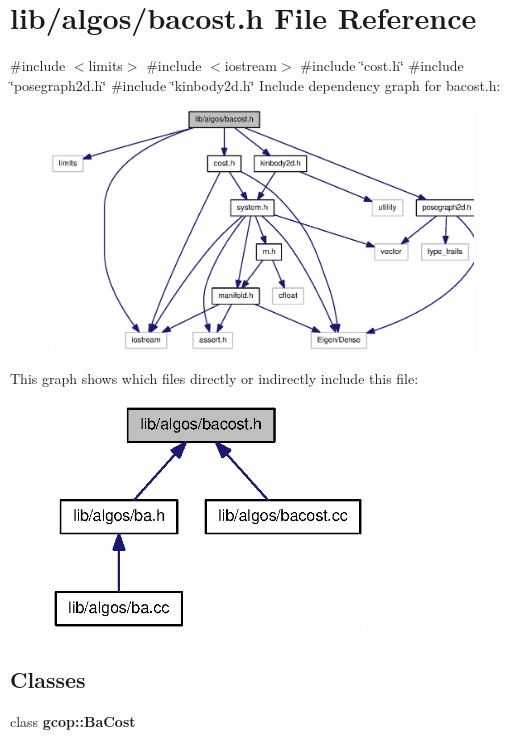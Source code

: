 \section{lib/algos/bacost.h \-File \-Reference}
\label{bacost_8h}
{\ttfamily \#include $<$limits$>$}\*
{\ttfamily \#include $<$iostream$>$}\*
{\ttfamily \#include \char`\"{}cost.\-h\char`\"{}}\*
{\ttfamily \#include \char`\"{}posegraph2d.\-h\char`\"{}}\*
{\ttfamily \#include \char`\"{}kinbody2d.\-h\char`\"{}}\*
\-Include dependency graph for bacost.\-h\-:\nopagebreak
\begin{figure}[H]
\begin{center}
\leavevmode
\includegraphics[width=350pt]{bacost_8h__incl}
\end{center}
\end{figure}
\-This graph shows which files directly or indirectly include this file\-:\nopagebreak
\begin{figure}[H]
\begin{center}
\leavevmode
\includegraphics[width=237pt]{bacost_8h__dep__incl}
\end{center}
\end{figure}
\subsection*{\-Classes}
\begin{DoxyCompactItemize}
\item 
class {\bf gcop\-::\-Ba\-Cost}
\end{DoxyCompactItemize}

